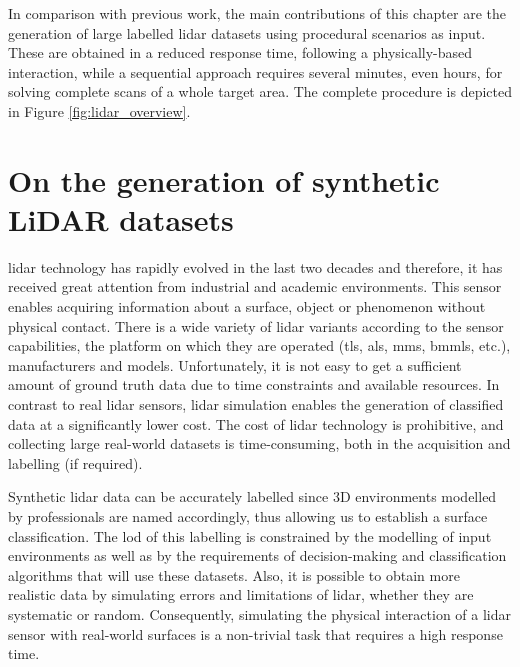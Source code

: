 In comparison with previous work, the main contributions of this chapter are the generation of large labelled \acrshort{lidar} datasets using procedural scenarios as input. These are obtained in a reduced response time, following a physically-based interaction, while a sequential approach requires several minutes, even hours, for solving complete scans of a whole target area. The complete procedure is depicted in Figure \ref{fig:lidar_overview}. 

\section{On the generation of synthetic LiDAR datasets}

\acrshort{lidar} technology has rapidly evolved in the last two decades and therefore, it has received great attention from industrial and academic environments. This sensor enables acquiring information about a surface, object or phenomenon without physical contact. There is a wide variety of \acrshort{lidar} variants according to the sensor capabilities, the platform on which they are operated (\acrshort{tls}, \acrshort{als}, \acrshort{mms}, \acrshort{bmmls}, etc.), manufacturers and models. Unfortunately, it is not easy to get a sufficient amount of ground truth data due to time constraints and available resources. In contrast to real \acrshort{lidar} sensors, \acrshort{lidar} simulation enables the generation of classified data at a significantly lower cost. The cost of \acrshort{lidar} technology is prohibitive, and collecting large real-world datasets is time-consuming, both in the acquisition and labelling (if required). 

Synthetic \acrshort{lidar} data can be accurately labelled since 3D environments modelled by professionals are named accordingly, thus allowing us to establish a surface classification. The \acrshort{lod} of this labelling is constrained by the modelling of input environments as well as by the requirements of decision-making and classification algorithms that will use these datasets. Also, it is possible to obtain more realistic data by simulating errors and limitations of \acrshort{lidar}, whether they are systematic or random. Consequently, simulating the physical interaction of a \acrshort{lidar} sensor with real-world surfaces is a non-trivial task that requires a high response time. 

